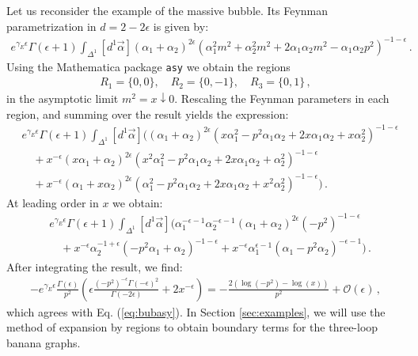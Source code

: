 \documentclass{article}
\begin{document}
Let us reconsider the example of the massive bubble. Its Feynman parametrization in $d=2-2\epsilon$ is given by:
\begin{align}
    e^{\gamma_E \epsilon} \Gamma(\epsilon+1) \int_{\Delta^{1}}\left[d^{1} \vec{\alpha}\right] \left(\alpha_{1}+\alpha_{2}\right)^{2 \epsilon} \left(\alpha_{1}^{2} m^{2}+\alpha_{2}^{2} m^{2}+2 \alpha_{1} \alpha_{2} m^{2}-\alpha_{1} \alpha_{2} p^{2}\right)^{-1-\epsilon}\,.
\end{align}
Using the Mathematica package \texttt{asy} we obtain the regions
\begin{align}
    R_1 = \{0,0\},\quad R_2 = \{0,-1\},\quad  R_3 = \{0,1\}\,,
\end{align}
in the asymptotic limit $m^2 = x \downarrow 0$. Rescaling the Feynman parameters in each region, and summing over the result yields the expression:
\begin{align}
    &e^{\gamma_E \epsilon} \Gamma(\epsilon+1)\int_{\Delta^{1}}\left[d^{1} \vec{\alpha}\right]\bigg(
   \left(\alpha_{1}+\alpha_{2}\right)^{2 \epsilon}\left(  x  \alpha_{1}^{2}-p^{2} \alpha_{1} \alpha_{2}+2  x  \alpha_{1} \alpha_{2}+ x \alpha_{2}^{2}\right)^{-1-\epsilon} \nonumber\\
    &\quad+ x^{-\epsilon}\left(x  \alpha_{1}+\alpha_{2}\right)^{2 \epsilon}\left( x^{2}  \alpha_{1}^{2}-p^{2} \alpha_{1} \alpha_{2}+2  x  \alpha_{1} \alpha_{2}+ \alpha_{2}^{2}\right)^{-1-\epsilon} \nonumber\\
    &\quad+x^{-\epsilon}\left(\alpha_{1}+x  \alpha_{2}\right)^{2 \epsilon}\left( \alpha_{1}^{2}-p^{2} \alpha_{1} \alpha_{2}+2  x \alpha_{1} \alpha_{2}+ x^{2}  \alpha_{2}^{2}\right)^{-1-\epsilon}\bigg)\,.
\end{align}
At leading order in $x$ we obtain:
\begin{align}
    &e^{\gamma_E \epsilon} \Gamma(\epsilon+1)\int_{\Delta^{1}}\left[d^{1} \vec{\alpha}\right]\bigg(\alpha_{1}^{-\epsilon-1} \alpha_{2}^{-\epsilon-1}\left(\alpha_{1}+\alpha_{2}\right)^{2 \epsilon}\left(-p^{2}\right)^{-1-\epsilon} \nonumber\\
    &\quad+x^{-\epsilon}\alpha_{2}^{-1+\epsilon}\left(-p^{2} \alpha_{1}+ \alpha_{2}\right)^{-1-\epsilon}+ x^{-\epsilon}\alpha_{1}^{\epsilon-1}\left( \alpha_{1} -p^{2}\alpha_{2} \right)^{-\epsilon-1}\bigg)\,.
\end{align}
After integrating the result, we find:
\begin{align}
   -e^{\gamma_E \epsilon} \frac{\Gamma(\epsilon)}{p^2}\left(\epsilon\frac{\left(-p^{2}\right)^{-\epsilon} \Gamma(-\epsilon)^{2} }{\Gamma(-2 \epsilon)}+2  x^{-\epsilon} \right) = -\frac{2\left(\log \left(-p^{2}\right)-\log ( x)\right)}{p^{2}}+\mathcal{O}(\epsilon)\,,
\end{align}
which agrees with Eq. (\ref{eq:bubasy}). In Section \ref{sec:examples}, we will use the method of expansion by regions to obtain boundary terms for the three-loop banana graphs.
\end{document}
